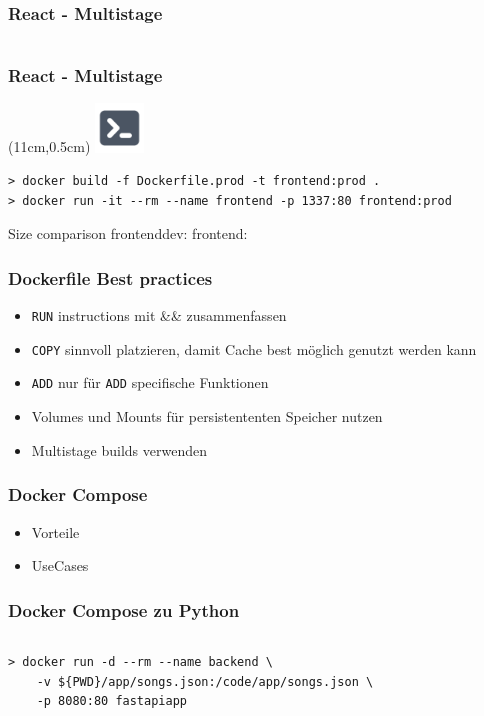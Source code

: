 \documentclass[22pt]{beamer}
\newcommand{\code}[1]{\colorbox{gray!10}{\texttt{#1}}}
\newcommand{\terminal}{
    \begin{textblock*}{1.3cm}(11cm,0.5cm) %
    \includegraphics[width=1.3cm]{Bilder/terminal.png}
    \end{textblock*}
}
\begin{document}
\begin{frame}[fragile]
    \frametitle{React - Multistage}
    \inputminted[fontsize=\footnotesize, frame=lines]{dockerfile}{../examples/React/Dockerfile.prod}
\end{frame}

\begin{frame}[fragile]
    \frametitle{React - Multistage}
    \terminal
\begin{verbatim}
> docker build -f Dockerfile.prod -t frontend:prod .
> docker run -it --rm --name frontend -p 1337:80 frontend:prod
\end{verbatim}

Size comparison
frontenddev:
frontend:

\end{frame}

\begin{frame}[t]
    \frametitle{Dockerfile Best practices}
    \begin{itemize}
        \item \code{RUN} instructions mit \&\& zusammenfassen
        \item \code{COPY} sinnvoll platzieren, damit Cache best möglich genutzt werden kann
        \item \code{ADD} nur für \code{ADD} specifische Funktionen
        \item Volumes und Mounts für persistententen Speicher nutzen
        \item Multistage builds verwenden
    \end{itemize} 
\end{frame}


\begin{frame}[t]
    \frametitle{Docker Compose}
    \begin{itemize}
        \item Vorteile
        \item UseCases
    \end{itemize} 
\end{frame}

\begin{frame}[fragile]
    \frametitle{Docker Compose zu Python}
    \inputminted[fontsize=\footnotesize, frame=lines]{dockerfile}{../examples/FastAPI/docker-compose.yml}
    \medskip
    \begin{verbatim}
> docker run -d --rm --name backend \
    -v ${PWD}/app/songs.json:/code/app/songs.json \
    -p 8080:80 fastapiapp 
        
    \end{verbatim}
\end{frame}
\end{document}
